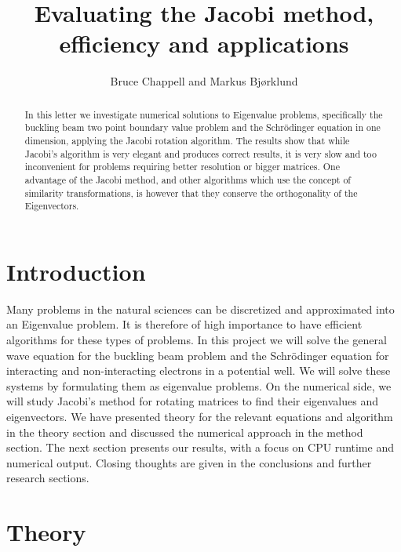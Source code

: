 \documentclass{emulateapj}
\begin{document}
\title{Evaluating the Jacobi method, efficiency and applications}

\author{Bruce Chappell and Markus Bjørklund}



\begin{abstract}
In this letter we investigate numerical solutions to Eigenvalue problems, specifically the buckling beam two point boundary value problem and the Schrödinger equation in one dimension, applying the Jacobi rotation algorithm. The results show that while Jacobi's algorithm is very elegant and produces correct results, it is very slow and too inconvenient for problems requiring better resolution or bigger matrices. One advantage of the Jacobi method, and other algorithms which use the concept of similarity transformations, is however that they conserve the orthogonality of the Eigenvectors.

\end{abstract}

\section{Introduction}
\label{sec:introduction}
Many problems in the natural sciences can be discretized and approximated into an Eigenvalue problem. It is therefore of high importance to have efficient algorithms for these types of problems. In this project we will solve the general wave equation for the buckling beam problem and the Schrödinger equation for interacting and non-interacting electrons in a potential well. We will solve these systems by formulating them as eigenvalue problems. On the numerical side, we will study Jacobi's method for rotating matrices to find their eigenvalues and eigenvectors. We have presented theory for the relevant equations and algorithm in the theory section and discussed the numerical approach in the method section. The next section presents our results, with a focus on CPU runtime and numerical output. Closing thoughts are given in the conclusions and further research sections.

\section{Theory}
\label{sec:method}
\end{document}
